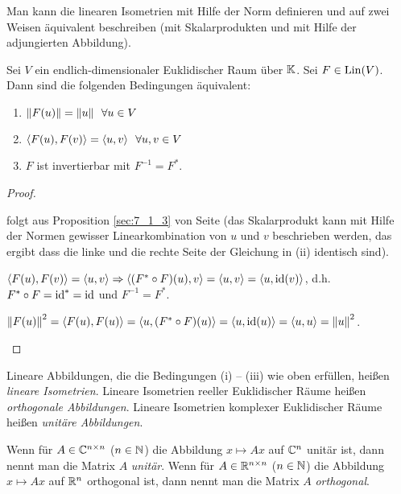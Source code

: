 Man kann die linearen Isometrien mit Hilfe der Norm definieren und auf  zwei Weisen äquivalent beschreiben (mit Skalarprodukten und mit Hilfe der adjungierten Abbildung). 
\begin{thm}
	Sei $ V $ ein endlich-dimensionaler Euklidischer Raum über $ \mathbb K $. Sei $ F \in \operatorname{Lin}(V) $. Dann sind die folgenden Bedingungen äquivalent:
	\begin{enumerate}
		\item
			$ \left\| F(u) \right\| = \left\| u \right\| \enspace \forall u \in V $
		\item
			$ \left\langle F(u),F(v) \right\rangle = \left\langle u,v \right\rangle \enspace \forall u,v \in V $
		\item
			$ F $ ist invertierbar mit $F^{-1} = F^\ast$. 
	\end{enumerate}
\end{thm}
\begin{proof}\
	\begin{description}[font=\normalfont]
		\item[(i)$ \Rightarrow $(ii):]
			folgt aus Proposition \ref*{sec:7_1_3} von Seite \pageref*{sec:7_1_3} (das Skalarprodukt kann mit Hilfe der Normen gewisser Linearkombination von $u$ und $v$ beschrieben werden, das ergibt dass die linke und die rechte Seite der Gleichung in (ii) identisch sind). 
		\item[(ii)$ \Rightarrow $(iii):]
			$ \left\langle F(u),F(v) \right\rangle = \left\langle u,v \right\rangle \Rightarrow \left\langle (F^\ast \circ F)(u),v \right\rangle = \left\langle u,v \right\rangle = \left\langle u,\operatorname{id}(v) \right\rangle $, d.h. $ F^\ast \circ F = \operatorname{id}^\ast = \operatorname{id} $ und $ F^{-1} = F^\ast $.
		\item[(iii)$ \Rightarrow $(i):]
			$ \left\| F(u) \right\|^2 = \left\langle F(u),F(u) \right\rangle = \left\langle u,(F^\ast \circ F)(u) \right\rangle = \left\langle u,\operatorname{id}(u) \right\rangle = \left\langle u,u \right\rangle = \left\| u \right\|^2 $. \qedhere
	\end{description}
\end{proof}

\noindent Lineare Abbildungen, die die Bedingungen (i) -- (iii) wie oben erfüllen, heißen \emph{lineare Isometrien}. Lineare Isometrien reeller Euklidischer Räume heißen \emph{orthogonale Abbildungen}. Lineare Isometrien komplexer Euklidischer Räume heißen \emph{unitäre Abbildungen}.

Wenn für $ A \in \mathbb C^{n \times n} $ ($ n \in \mathbb N $) die Abbildung $ x \mapsto Ax $ auf $ \mathbb C^n $ unitär ist, dann nennt man die Matrix $ A $ \emph{unitär}. Wenn für $ A \in \mathbb R^{n \times n} $ ($ n \in \mathbb N $) die Abbildung $ x \mapsto Ax $ auf $ \mathbb R^n $ orthogonal ist, dann nennt man die Matrix $ A $ \emph{orthogonal}.

